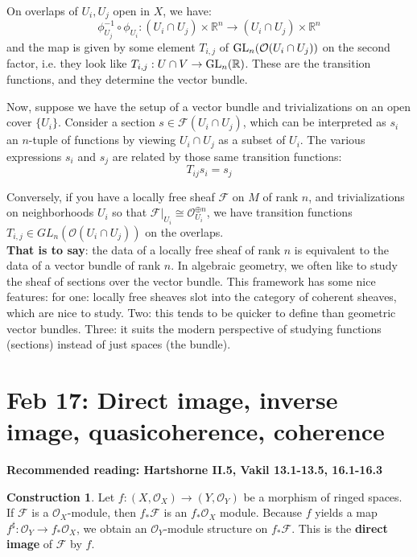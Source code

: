 \documentclass[10pt,reqno]{amsart}
\theoremstyle{definition}
\newtheorem{construction}[theorem]{Construction}
\theoremstyle{remark}
\numberwithin{equation}{section}
\numberwithin{theorem}{section}
\newcommand{\OO}{{\mathcal O}}
\newcommand{\R}{{\mathbb R}}
\newcommand{\FF}{{\mathscr F}}
\begin{document}
On overlaps of $U_i,U_j$ open in $X$, we have:
\[\phi_{U_j}^{-1} \circ \phi_{U_i}: (U_i \cap U_j) \times \R^n \to (U_i \cap U_j) \times \R^n\]
and the map is given by some element $T_{i,j}$ of $\textup{GL}_n(\OO(U_i \cap U_j))$ on the second factor, i.e. they look like $T_{i,j}: U \cap V \to \textup{GL}_n(\R)$. These are the transition functions, and they determine the vector bundle. 

Now, suppose we have the setup of a vector bundle and trivializations on an open cover $\{U_i\}$. Consider a section $s \in \FF(U_i \cap U_j)$, which can be interpreted as $s_i$ an $n$-tuple of functions by viewing $U_i \cap U_j$ as a subset of $U_i$. The various expressions $s_i$ and $s_j$ are related by those same transition functions:
\[T_{ij}s_i = s_j \]

Conversely, if you have a locally free sheaf $\FF$ on $M$ of rank $n$, and trivializations on neighborhoods $U_i$ so that $\FF|_{U_i} \cong \OO_{U_i}^{\oplus n}$, we have transition functions $T_{i,j} \in GL_{n}(\OO(U_i \cap U_j))$ on the overlaps.
\\

\textbf{That is to say}: the data of a locally free sheaf of rank $n$ is equivalent to the data of a vector bundle of rank $n$. In algebraic geometry, we often like to study the sheaf of sections over the vector bundle. This framework has some nice features: for one: locally free sheaves slot into the category of coherent sheaves, which are nice to study. Two: this tends to be quicker to define than geometric vector bundles. Three: it suits the modern perspective of studying functions (sections) instead of just spaces (the bundle).
\\

\section{Feb 17: Direct image, inverse image, quasicoherence, coherence}
\textbf{Recommended reading: Hartshorne II.5, Vakil 13.1-13.5, 16.1-16.3}


\begin{construction} Let $f: (X,\OO_X) \to (Y,\OO_Y)$ be a morphism of ringed spaces. If $\FF$ is a $\OO_X$-module, then $f_* \FF$ is an $f_* \OO_X$ module. Because $f$ yields a map $f^{\sharp} : \OO_Y \to f_* \OO_X$, we obtain an $\OO_Y$-module structure on $f_* \FF$. This is the \textbf{direct image} of $\FF$ by $f$.
\end{construction}
\end{document}
